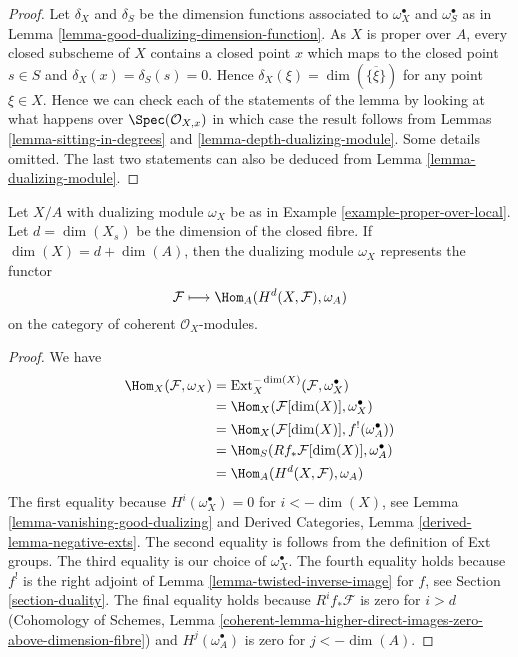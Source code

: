 \begin{proof}
Let $\delta_X$ and $\delta_S$ be the dimension functions associated to
$\omega_X^\bullet$ and $\omega_S^\bullet$ as in
Lemma \ref{lemma-good-dualizing-dimension-function}.
As $X$ is proper over $A$, every closed subscheme of $X$ contains
a closed point $x$ which maps to the closed point $s \in S$
and $\delta_X(x) = \delta_S(s) = 0$. Hence
$\delta_X(\xi) = \dim(\overline{\{\xi\}})$ for any point
$\xi \in X$. Hence we can check each of
the statements of the lemma by looking at what happens over
$\Spec(\mathcal{O}_{X, x})$ in which case the result follows
from Lemmas \ref{lemma-sitting-in-degrees} and
\ref{lemma-depth-dualizing-module}.
Some details omitted.
The last two statements can also be deduced from
Lemma \ref{lemma-dualizing-module}.
\end{proof}

\begin{lemma}
\label{lemma-dualizing-module-proper-over-A}
Let $X/A$ with dualizing module $\omega_X$ be as in
Example \ref{example-proper-over-local}.
Let $d = \dim(X_s)$ be the dimension
of the closed fibre. If $\dim(X) = d + \dim(A)$, then
the dualizing module $\omega_X$ represents the functor
$$
\mathcal{F} \longmapsto \Hom_A(H^d(X, \mathcal{F}), \omega_A)
$$
on the category of coherent $\mathcal{O}_X$-modules.
\end{lemma}

\begin{proof}
We have
\begin{align*}
\Hom_X(\mathcal{F}, \omega_X)
& =
\text{Ext}^{-\dim(X)}_X(\mathcal{F}, \omega_X^\bullet) \\
& =
\Hom_X(\mathcal{F}[\dim(X)], \omega_X^\bullet) \\
& =
\Hom_X(\mathcal{F}[\dim(X)], f^!(\omega_A^\bullet)) \\
& =
\Hom_S(Rf_*\mathcal{F}[\dim(X)], \omega_A^\bullet) \\
& =
\Hom_A(H^d(X, \mathcal{F}), \omega_A)
\end{align*}
The first equality because $H^i(\omega_X^\bullet) = 0$ for
$i < -\dim(X)$, see Lemma \ref{lemma-vanishing-good-dualizing} and
Derived Categories, Lemma \ref{derived-lemma-negative-exts}.
The second equality is follows from the definition of Ext groups.
The third equality is our choice of $\omega_X^\bullet$.
The fourth equality holds because $f^!$ is the
right adjoint of Lemma \ref{lemma-twisted-inverse-image} for
$f$, see Section \ref{section-duality}.
The final equality holds because $R^if_*\mathcal{F}$ is zero
for $i > d$ (Cohomology of Schemes, Lemma
\ref{coherent-lemma-higher-direct-images-zero-above-dimension-fibre})
and $H^j(\omega_A^\bullet)$ is zero for $j < -\dim(A)$.
\end{proof}








